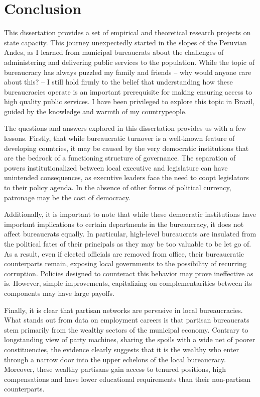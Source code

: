\section{Conclusion}

This dissertation provides a set of empirical and theoretical research projects on state capacity. This journey unexpectedly started in the slopes of the Peruvian Andes, as I learned from municipal bureaucrats about the challenges of administering and delivering public services to the population. While the topic of bureaucracy has always puzzled my family and friends -- why would anyone care about this? -- I still hold firmly to the belief that understanding how these bureaucracies operate is an important prerequisite for making ensuring access to high quality public services. I have been privileged to explore this topic in Brazil, guided by the knowledge and warmth of my countrypeople.

The questions and answers explored in this dissertation provides us with a few lessons. Firstly, that while bureaucratic turnover is a well-known feature of developing countries, it may be caused by the very democratic institutions that are the bedrock of a functioning structure of governance. The separation of powers institutionalized between local executive and legislature can have unintended consequences, as executive leaders face the need to coopt legislators to their policy agenda. In the absence of other forms of political currency, patronage may be the cost of democracy.

Additionally, it is important to note that while these democratic institutions have important implications to certain departments in the bureaucracy, it does not affect bureaucrats equally. In particular, high-level bureaucrats are insulated from the political fates of their principals as they may be too valuable to be let go of. As a result, even if elected officials are removed from office, their bureaucratic counterparts remain, exposing local governments to the possibility of recurring corruption. Policies designed to counteract this behavior may prove ineffective as is. However, simple improvements, capitalizing on complementarities between its components may have large payoffs.

Finally, it is clear that partisan networks are pervasive in local bureaucracies. What stands out from data on employment careers is that partisan bureaucrats stem primarily from the wealthy sectors of the municipal economy. Contrary to longstanding view of party machines, sharing the spoils with a wide net of poorer constituencies, the evidence clearly suggests that it is the wealthy who enter through a narrow door into the upper echelons of the local bureaucracy. Moreover, these wealthy partisans gain access to tenured positions, high compensations and have lower educational requirements than their non-partisan counterparts.

